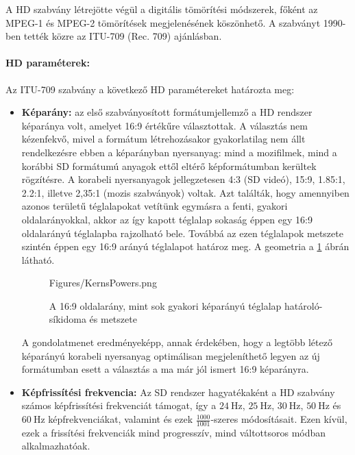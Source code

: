 A HD szabvány létrejötte végül a digitális tömörítési módszerek, főként az MPEG-1 és MPEG-2 tömörítések megjelenésének köszönhető.
A szabványt 1990-ben tették közre az ITU-709 (Rec. 709) ajánlásban.

\paragraph{HD paraméterek:\\}

Az ITU-709 szabvány a következő HD paramétereket határozta meg:
\begin{itemize}
\item \textbf{Képarány:} az első szabványosított formátumjellemző a HD rendszer képaránya volt, amelyet 16:9 értékűre választottak.
A választás nem kézenfekvő, mivel a formátum létrehozásakor gyakorlatilag nem állt rendelkezésre ebben a képarányban nyersanyag: mind a mozifilmek, mind a korábbi SD formátumú anyagok ettől eltérő képformátumban kerültek rögzítésre.
A korabeli nyersanyagok jellegzetesen 4:3 (SD videó), 15:9, 1.85:1, 2.2:1, illetve 2,35:1 (mozis szabványok) voltak.
Azt találták, hogy amennyiben azonos területű téglalapokat vetítünk egymásra a fenti, gyakori oldalarányokkal, akkor az így kapott téglalap sokaság éppen egy 16:9 oldalarányú téglalapba rajzolható bele.
Továbbá az ezen téglalapok metszete szintén éppen egy 16:9 arányú téglalapot határoz meg.
A geometria a \ref{Fig:kerns_powers} ábrán látható.
\begin{figure}[]
	\centering
	\begin{overpic}[width = 0.9 \columnwidth ]{Figures/KernsPowers.png}
	\small
	\end{overpic}
	\caption{A 16:9 oldalarány, mint sok gyakori képarányú téglalap határoló-síkidoma és metszete}
	\label{Fig:kerns_powers}
\end{figure}
A gondolatmenet eredményeképp, annak érdekében, hogy a legtöbb létező képarányú korabeli nyersanyag optimálisan megjeleníthető legyen az új formátumban esett a választás a ma már jól ismert 16:9 képarányra.

\item \textbf{Képfrissítési frekvencia:} Az SD rendszer hagyatékaként a HD szabvány számos képfrissítési frekvenciát támogat, így a $24~\mathrm{Hz}$, $25~\mathrm{Hz}$, $30~\mathrm{Hz}$, $50~\mathrm{Hz}$ és $60~\mathrm{Hz}$ képfrekvenciákat, valamint és ezek $\frac{1000}{1001}$-szeres módosításait.
Ezen kívül, ezek a frissítési frekvenciák mind progresszív, mind váltottsoros módban alkalmazhatóak.


\end{itemize}
